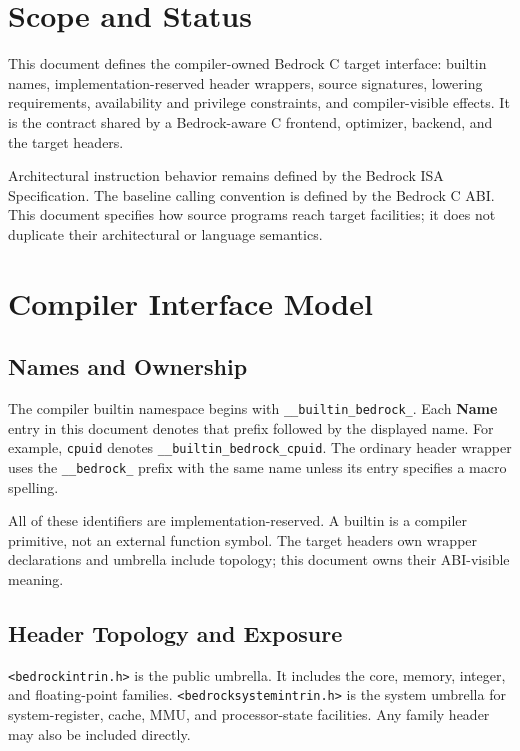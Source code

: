 \documentclass[10pt,twoside]{article}
\begin{document}
\BedrockDocumentHasFiguresfalse
\BedrockFrontMatter

\clearpage
\section{Scope and Status}\label{page:scope-and-status}
This document defines the compiler-owned Bedrock C target interface: builtin
names, implementation-reserved header wrappers, source signatures, lowering
requirements, availability and privilege constraints, and compiler-visible
effects. It is the contract shared by a Bedrock-aware C frontend, optimizer,
backend, and the target headers.

Architectural instruction behavior remains defined by the Bedrock ISA
Specification. The baseline calling convention is defined by the Bedrock C
ABI. This document specifies how source programs reach target facilities; it
does not duplicate their architectural or language semantics.


\section{Compiler Interface Model}\label{page:compiler-interface-model}

\subsection{Names and Ownership}
The compiler builtin namespace begins with
\texttt{\_\_builtin\_bedrock\_}. Each \textbf{Name} entry in this document
denotes that prefix followed by the displayed name. For example,
\texttt{cpuid} denotes
\texttt{\_\_builtin\_bedrock\_cpuid}. The ordinary header wrapper uses the
\texttt{\_\_bedrock\_} prefix with the same name unless its entry specifies a
macro spelling.

All of these identifiers are implementation-reserved. A builtin is a compiler
primitive, not an external function symbol. The target headers own wrapper
declarations and umbrella include topology; this document owns their
ABI-visible meaning.

\subsection{Header Topology and Exposure}
\texttt{<bedrockintrin.h>} is the public umbrella. It includes the core, memory,
integer, and floating-point families. \texttt{<bedrocksystemintrin.h>} is the system
umbrella for system-register, cache, MMU, and processor-state facilities. Any
family header may also be included directly.
\end{document}
